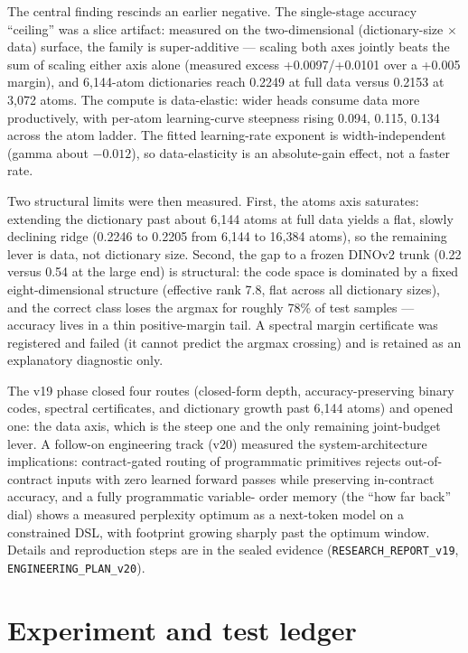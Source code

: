 \documentclass[12pt,oneside]{report}
\begin{document}
The central finding rescinds an earlier negative. The single-stage accuracy
``ceiling'' was a slice artifact: measured on the two-dimensional
(dictionary-size $\times$ data) surface, the family is super-additive ---
scaling both axes jointly beats the sum of scaling either axis alone
(measured excess +0.0097/+0.0101 over a +0.005 margin), and 6{,}144-atom
dictionaries reach 0.2249 at full data versus 0.2153 at 3{,}072 atoms. The
compute is data-elastic: wider heads consume data more productively, with
per-atom learning-curve steepness rising 0.094, 0.115, 0.134 across the atom
ladder. The fitted learning-rate exponent is width-independent (gamma about
$-0.012$), so data-elasticity is an absolute-gain effect, not a faster rate.

Two structural limits were then measured. First, the atoms axis saturates:
extending the dictionary past about 6{,}144 atoms at full data yields a flat,
slowly declining ridge (0.2246 to 0.2205 from 6{,}144 to 16{,}384 atoms), so
the remaining lever is data, not dictionary size. Second, the gap to a frozen
DINOv2 trunk (0.22 versus 0.54 at the large end) is structural: the code
space is dominated by a fixed eight-dimensional structure (effective rank
7.8, flat across all dictionary sizes), and the correct class loses the
argmax for roughly 78\% of test samples --- accuracy lives in a thin
positive-margin tail. A spectral margin certificate was registered and
failed (it cannot predict the argmax crossing) and is retained as an
explanatory diagnostic only.

The v19 phase closed four routes (closed-form depth, accuracy-preserving
binary codes, spectral certificates, and dictionary growth past 6{,}144
atoms) and opened one: the data axis, which is the steep one and the only
remaining joint-budget lever. A follow-on engineering track (v20) measured
the system-architecture implications: contract-gated routing of programmatic
primitives rejects out-of-contract inputs with zero learned forward passes
while preserving in-contract accuracy, and a fully programmatic variable-
order memory (the ``how far back'' dial) shows a measured perplexity optimum
as a next-token model on a constrained DSL, with footprint growing sharply
past the optimum window. Details and reproduction steps are in the sealed
evidence (\texttt{RESEARCH\_REPORT\_v19}, \texttt{ENGINEERING\_PLAN\_v20}).

\section{Experiment and test ledger}
\end{document}
